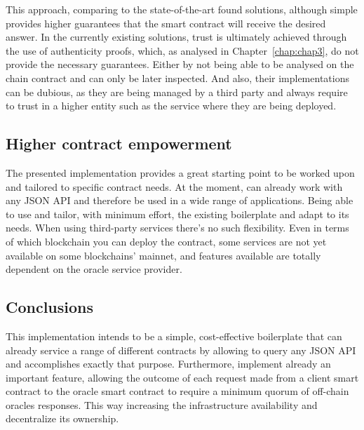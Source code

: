 This approach, comparing to the state-of-the-art found solutions, although simple provides higher guarantees that the smart contract will receive the desired answer. In the currently existing solutions, trust is ultimately achieved through the use of authenticity proofs, which, as analysed in Chapter~\ref{chap:chap3}, do not provide the necessary guarantees. Either by not being able to be analysed on the chain contract and can only be later inspected. And also, their implementations can be dubious, as they are being managed by a third party and always require to trust in a higher entity such as the service where they are being deployed.

\subsection{Higher contract empowerment}

The presented implementation provides a great starting point to be worked upon and tailored to specific contract needs. At the moment, can already work with any JSON API and therefore be used in a wide range of applications. Being able to use and tailor, with minimum effort, the existing boilerplate and adapt to its needs. When using third-party services there's no such flexibility. Even in terms of which blockchain you can deploy the contract, some services are not yet available on some blockchains' mainnet, and features available are totally dependent on the oracle service provider.

\subsection{Conclusions}

This implementation intends to be a simple, cost-effective boilerplate that can already service a range of different contracts by allowing to query any JSON API and accomplishes exactly that purpose. Furthermore, implement already an important feature, allowing the outcome of each request made from a client smart contract to the oracle smart contract to require a minimum quorum of off-chain oracles responses. This way increasing the infrastructure availability and decentralize its ownership.

